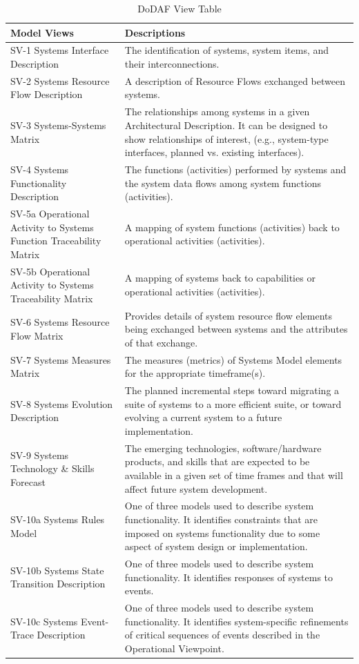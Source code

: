 \documentclass[num-refs]{wiley-article}
\begin{document}
\begin{table}[bt]
\begin{center}
\begin{tabular}{| m{10em} | m{30em} |}
Model Views & Descriptions \\
\hline
SV-1 Systems Interface Description & The identification of systems, system items, and their interconnections. \\
SV-2 Systems Resource Flow Description & A description of Resource Flows exchanged between systems. \\
SV-3 Systems-Systems Matrix & The relationships among systems in a given Architectural Description. It can be designed to show relationships of interest, (e.g., system-type interfaces, planned vs. existing interfaces). \\
SV-4 Systems Functionality Description & The functions (activities) performed by systems and the system data flows among system functions (activities). \\
SV-5a Operational Activity to Systems Function Traceability Matrix & A mapping of system functions (activities) back to operational activities (activities). \\
SV-5b Operational Activity to Systems Traceability Matrix & A mapping of systems back to capabilities or operational activities (activities). \\
SV-6 Systems Resource Flow Matrix & Provides details of system resource flow elements being exchanged between systems and the attributes of that exchange. \\
SV-7 Systems Measures Matrix & The measures (metrics) of Systems Model elements for the appropriate timeframe(s). \\
SV-8 Systems Evolution Description & The planned incremental steps toward migrating a suite of systems to a more efficient suite, or toward evolving a current system to a future implementation. \\
SV-9 Systems Technology \& Skills Forecast & The emerging technologies, software/hardware products, and skills that are expected to be available in a given set of time frames and that will affect future system development. \\
SV-10a Systems Rules Model & One of three models used to describe system functionality. It identifies constraints that are imposed on systems functionality due to some aspect of system design or implementation. \\
SV-10b Systems State Transition Description & One of three models used to describe system functionality. It identifies responses of systems to events. \\
SV-10c Systems Event-Trace Description & One of three models used to describe system functionality. It identifies system-specific refinements of critical sequences of events described in the Operational Viewpoint. \\
\end{tabular}
\caption{DoDAF View Table\cite{ChiefInformationOfficer2010}}
\label{table1}
\end{center}
\end{table}
\end{document}

